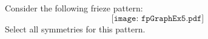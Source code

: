 \documentclass{ximera}
\author{Bart Snapp}
\begin{document}
\begin{exercise}
  Consider the following frieze pattern:
  \[
  \texttt{[image: fpGraphEx5.pdf]}
  \]
  Select all symmetries for this pattern.
  \begin{selectAll}
  \end{selectAll}
\end{exercise}
\end{document}
